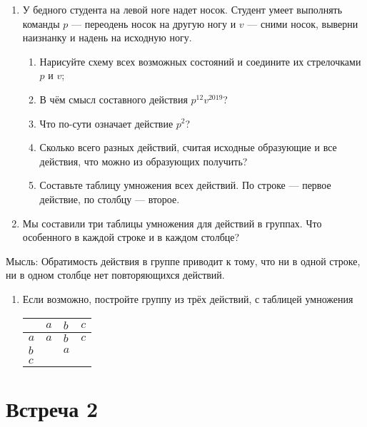 \documentclass[a4paper, 12pt]{article}
\begin{document}
\begin{enumerate}
  \item У бедного студента на левой ноге надет носок. Студент умеет выполнять команды $p$ — переодень носок на другую ногу и $v$ — сними носок, выверни наизнанку и надень на исходную ногу.     
    \begin{enumerate}
      \item Нарисуйте схему всех возможных состояний и соедините их стрелочками $p$ и $v$;
      \item В чём смысл составного действия $p^{12}v^{2019}$?
      \item Что по-сути означает действие $p^2$?
      \item Сколько всего разных действий, считая исходные образующие и все действия, что можно из образующих получить?
      \item Составьте таблицу умножения всех действий. По строке — первое действие, по столбцу — второе.
    \end{enumerate}

  \item Мы составили три таблицы умножения для действий в группах. Что особенного в каждой строке и в каждом столбце?


\end{enumerate}

Мысль: Обратимость действия в группе приводит к тому, что ни в одной строке, ни в одном столбце нет повторяющихся действий.

\begin{enumerate}[resume]
  \item Если возможно, постройте группу из трёх действий, с таблицей умножения
\begin{tabular}{@{}llll@{}}
\toprule
 & $a$ & $b$ & $c$   \\ \midrule
$a$ & $a$  & $b$ & $c$   \\
$b$ &  & $a$ &    \\
$c$ &  &  &    \\ \bottomrule
\end{tabular}
\end{enumerate}




\section{Встреча 2}
\end{document}
